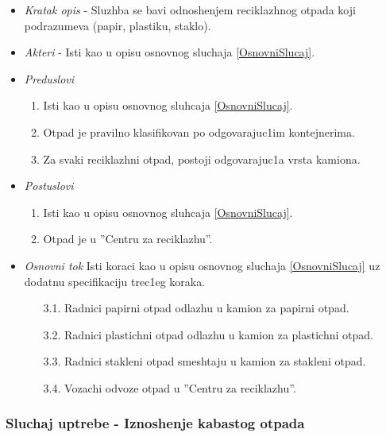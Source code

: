 \documentclass[10 pt]{article}
\begin{document}
		\begin{itemize}
			\item\textit{Kratak opis} - Sluzhba se bavi odnoshenjem reciklazhnog otpada koji podrazumeva (papir, plastiku, staklo).
			
			\item\textit{Akteri} - Isti kao u opisu osnovnog sluchaja \ref{OsnovniSlucaj}.
			
			\item\textit{Preduslovi}
				\begin{enumerate}
					\item Isti kao u opisu osnovnog sluhcaja \ref{OsnovniSlucaj}.
					\item Otpad je pravilno klasifikovan po odgovarajuc1im kontejnerima.
					\item Za svaki reciklazhni otpad, postoji odgovarajuc1a vrsta kamiona.
				\end{enumerate}
			
			\item\textit{Postuslovi}
				\begin{enumerate}
					\item Isti kao u opisu osnovnog sluhcaja \ref{OsnovniSlucaj}.
					\item Otpad je u ''Centru za reciklazhu''.
				\end{enumerate}
		
			\item\textit{Osnovni tok}
				Isti koraci kao u opisu osnovnog sluchaja \ref{OsnovniSlucaj}
				uz dodatnu specifikaciju trec1eg koraka.
				\begin{enumerate}
					\item [3.1.] Radnici papirni otpad odlazhu u kamion za papirni otpad.
					\item [3.2.] Radnici plastichni otpad odlazhu u kamion za plastichni otpad.
					\item [3.3.] Radnici stakleni otpad smeshtaju u kamion za stakleni otpad.
					\item [3.4.] Vozachi odvoze otpad u ''Centru za reciklazhu''.
				\end{enumerate}
		\end{itemize}
	
	\subsubsection{Sluchaj uptrebe - Iznoshenje kabastog otpada}
		
\end{document}
